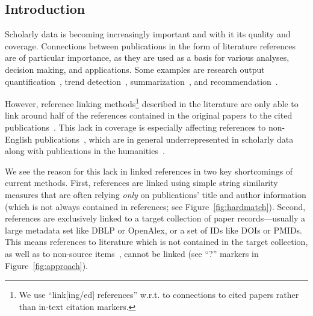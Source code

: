 \subsection{Introduction}
Scholarly data is becoming increasingly important and with it its quality and coverage. Connections between publications in the form of literature references are of particular importance, as they are used as a basis for various analyses, decision making, and applications. Some examples are research output quantification~\cite{Hirsch2005}, trend detection~\cite{Chen2006}, summarization~\cite{Elkiss2008}, and recommendation~\cite{Ma2020,Faerber202x}.

However, reference linking methods\footnote{We use ``link[ing/ed] references'' w.r.t. to connections to cited papers rather than in-text citation markers.} described in the literature are only able to link around half of the references contained in the original papers to the cited publications~\cite{Lo2020,Saier2020}. This lack in coverage is especially affecting references to non-English publications~\cite{Saier2021}, which are in general underrepresented in scholarly data~\cite{Vera-Baceta2019,Liu2019,Moed2018,Moskaleva2019} along with publications in the humanities~\cite{Colavizza2019,Kellsey2004}.

We see the reason for this lack in linked references in two key shortcomings of current methods.
First, references are linked using simple string similarity measures that are often relying \emph{only} on publications' title and author information (which is not always contained in references; see Figure~\ref{fig:hardmatch}). %
Second, references are exclusively linked to a target collection of paper records---usually a large metadata set like DBLP or OpenAlex, or a set of IDs like DOIs or PMIDs. This means references to literature which is not contained in the target collection, as well as to non-source items~\cite{Chi2014}, cannot be linked (see ``?'' markers in Figure~\ref{fig:approach}).

